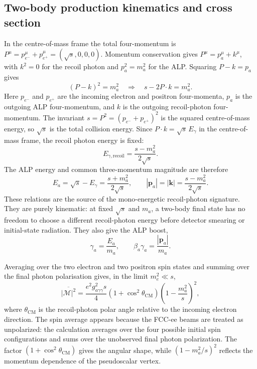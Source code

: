 \documentclass[12pt,a4paper]{article}
\newcommand{\gagg}{g_{a\gamma\gamma}}
\newcommand{\ma}{m_a}
\newcommand{\sqrts}{\sqrt{s}}
\begin{document}
\subsection{Two-body production kinematics and cross section}

In the centre-of-mass frame the total four-momentum is
$P^\mu=p_{e^-}^\mu+p_{e^+}^\mu=(\sqrts,0,0,0)$.
Momentum conservation gives $P^\mu=p_a^\mu+k^\mu$, with $k^2=0$ for the recoil
photon and $p_a^2=\ma^2$ for the ALP. Squaring $P-k=p_a$ gives
\begin{equation}
    (P-k)^2=\ma^2
    \quad\Rightarrow\quad
    s-2P\cdot k=\ma^2.
\end{equation}
Here $p_{e^-}$ and $p_{e^+}$ are the incoming electron and positron
four-momenta, $p_a$ is the outgoing ALP four-momentum, and $k$ is the outgoing
recoil-photon four-momentum. The invariant
$s=P^2=(p_{e^-}+p_{e^+})^2$ is the squared centre-of-mass energy, so
$\sqrts$ is the total collision energy. Since $P\cdot k=\sqrts\,E_\gamma$ in
the centre-of-mass frame, the recoil photon energy is fixed:
\begin{equation}
    E_{\gamma,\mathrm{recoil}}
    =
    \frac{s-\ma^2}{2\sqrts}.
    \label{eq:Egamma}
\end{equation}
The ALP energy and common three-momentum magnitude are therefore
\begin{equation}
    E_a
    =
    \sqrts-E_\gamma
    =
    \frac{s+\ma^2}{2\sqrts},
    \qquad
    |\mathbf{p}_a|
    =
    |\mathbf{k}|
    =
    \frac{s-\ma^2}{2\sqrts}.
    \label{eq:two_body_kinematics}
\end{equation}
These relations are the source of the mono-energetic recoil-photon signature.
They are purely kinematic: at fixed $\sqrts$ and $\ma$, a two-body final state
has no freedom to choose a different recoil-photon energy before detector
smearing or initial-state radiation. They also give the ALP boost,
\begin{equation}
    \gamma_a=\frac{E_a}{\ma},
    \qquad
    \beta_a\gamma_a=\frac{|\mathbf{p}_a|}{\ma}.
    \label{eq:boost}
\end{equation}

Averaging over the two electron and two positron spin states and summing over
the final photon polarisation gives, in the limit $m_e^2\ll s$,
\begin{equation}
    \overline{|\mathcal{M}|^2}
    =
    \frac{e^2\gagg^2s}{4}
    \left(1+\cos^2\theta_\mathrm{CM}\right)
    \left(1-\frac{\ma^2}{s}\right)^2,
    \label{eq:prod_m2}
\end{equation}
where $\theta_\mathrm{CM}$ is the recoil-photon polar angle relative to the
incoming electron direction. The spin average appears because the FCC-ee beams
are treated as unpolarized: the calculation averages over the four possible
initial spin configurations and sums over the unobserved final photon
polarization. The factor $(1+\cos^2\theta_\mathrm{CM})$ gives the angular
shape, while $(1-\ma^2/s)^2$ reflects the momentum dependence of the
pseudoscalar vertex.
\end{document}
